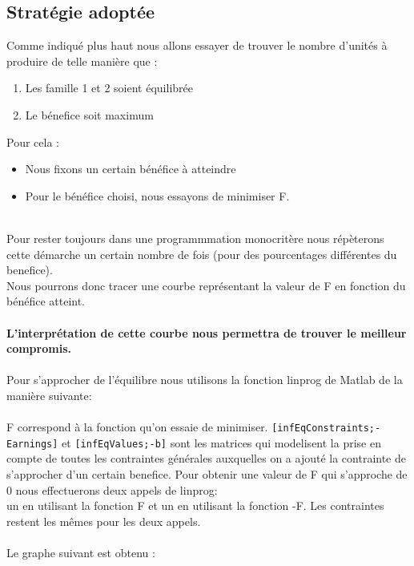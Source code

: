 \subsection{Stratégie adoptée}
Comme indiqué plus haut nous allons essayer de trouver le nombre d'unités à produire de telle manière que :
\begin{enumerate}
	\item Les famille 1 et 2 soient équilibrée
	\item Le bénefice soit maximum
\end{enumerate}

Pour cela :
\begin{itemize}
	\item Nous fixons un certain bénéfice à atteindre
	\item Pour le bénéfice choisi, nous essayons de minimiser F. 
\end{itemize}
~\\
Pour rester toujours dans une programmmation monocritère nous répèterons cette
démarche un certain nombre de fois (pour des pourcentages différentes du benefice).\\
Nous pourrons donc tracer une courbe représentant la valeur de F en fonction du bénéfice atteint.\\
~\\
\textbf{L'interprétation de cette courbe nous permettra de trouver le 
meilleur compromis.}\\
~\\
Pour s'approcher de l'équilibre nous utilisons la fonction linprog de Matlab de la
manière suivante:\\
~\\
F correspond à la fonction qu'on essaie de minimiser.
\texttt{[infEqConstraints;-Earnings]} et \texttt{[infEqValues;-b]} sont les matrices qui
modelisent la prise en compte de toutes les contraintes générales auxquelles on
a ajouté la contrainte de s'approcher d'un certain benefice. Pour obtenir une
valeur de F qui s'approche de 0 nous effectuerons deux appels de linprog:\\
un en utilisant la fonction F et un en utilisant la fonction -F. Les contraintes
restent les mêmes pour les deux appels.\\
~\\
Le graphe suivant est obtenu :
